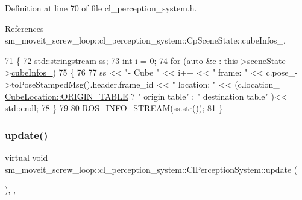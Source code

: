 Definition at line 70 of file cl\+\_\+perception\+\_\+system.\+h.



References sm\+\_\+moveit\+\_\+screw\+\_\+loop\+::cl\+\_\+perception\+\_\+system\+::\+Cp\+Scene\+State\+::cube\+Infos\+\_\+.


\begin{DoxyCode}
71             \{
72                 std::stringstream ss;
73                 \textcolor{keywordtype}{int} i = 0;
74                 \textcolor{keywordflow}{for} (\textcolor{keyword}{auto} &c : this->\hyperlink{classsm__moveit__screw__loop_1_1cl__perception__system_1_1ClPerceptionSystem_abb08b3cc6d4ec414a608da92133b1f66}{sceneState\_}->\hyperlink{classsm__moveit__screw__loop_1_1cl__perception__system_1_1CpSceneState_afef6eaf7eb94cf74b9333a373b2fb35d}{cubeInfos\_})
75                 \{
76 
77                     ss << \textcolor{stringliteral}{"- Cube "} << i++ << \textcolor{stringliteral}{" frame: "} << c.pose\_->toPoseStampedMsg().header.frame\_id << \textcolor{stringliteral}{
      " location: "} << (c.location\_ == \hyperlink{namespacesm__moveit__screw__loop_1_1cl__perception__system_a3685ee11048648ccb59214d2341fb8caae5ee34c3ef8ec4a46a00a218416c7b1d}{CubeLocation::ORIGIN\_TABLE} ? \textcolor{stringliteral}{" origin table"} : \textcolor{stringliteral}{"
       destination table"} )<< std::endl;
78                 \}
79 
80                 ROS\_INFO\_STREAM(ss.str());
81             \}
\end{DoxyCode}
\mbox{\label{classsm__moveit__screw__loop_1_1cl__perception__system_1_1ClPerceptionSystem_a171e1bf0334b2eb957792ecb3ad11b7a}} 
\subsubsection{\texorpdfstring{update()}{update()}}
{\footnotesize\ttfamily virtual void sm\+\_\+moveit\+\_\+screw\+\_\+loop\+::cl\+\_\+perception\+\_\+system\+::\+Cl\+Perception\+System\+::update (\begin{DoxyParamCaption}{ }\end{DoxyParamCaption})\hspace{0.3cm}{\ttfamily [inline]}, {\ttfamily [override]}, {\ttfamily [virtual]}}



